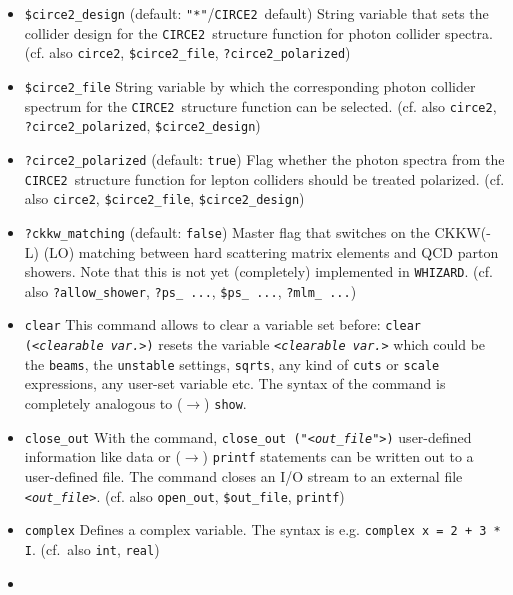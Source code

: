 \documentclass[12pt]{book}
\newcommand{\ttt}[1]{\texttt{#1}}
\newcommand{\whizard}{\texttt{WHIZARD}}
\newcommand{\circetwo}{\texttt{CIRCE2}}
\begin{document}
\begin{itemize}
\item
\ttt{\$circe2\_design} \qquad (default: \ttt{"*"}/\circetwo\ default)
\newline 
String variable that sets the collider design for the \circetwo\
structure function for photon collider spectra. (cf. also
\ttt{circe2}, \ttt{\$circe2\_file}, \ttt{?circe2\_polarized})
\item
\ttt{\$circe2\_file} \newline
String variable by which the corresponding photon collider spectrum
for the \circetwo\ structure function can be selected. (cf. also
\ttt{circe2}, \ttt{?circe2\_polarized}, \ttt{\$circe2\_design})
\item
\ttt{?circe2\_polarized} \qquad (default: \ttt{true}) \newline
Flag whether the photon spectra from the \circetwo\ structure function
for lepton colliders should be treated polarized. (cf. also
\ttt{circe2}, \ttt{\$circe2\_file}, \ttt{\$circe2\_design})
\item
\ttt{?ckkw\_matching} \qquad (default: \ttt{false}) \newline
Master flag that switches on the CKKW(-L) (LO) matching between hard
scattering matrix elements and QCD parton showers. Note that this is
not yet (completely) implemented in \whizard. (cf. also
\ttt{?allow\_shower}, \ttt{?ps\_ ...}, \ttt{\$ps\_ ...}, \ttt{?mlm\_
  ...})  
\item
\ttt{clear} \newline
This command allows to clear a variable set before: \ttt{clear
({\em <clearable var.>})} resets the variable \ttt{{\em <clearable var.>}} which
could be the \ttt{beams}, the \ttt{unstable} settings, \ttt{sqrts},
any kind of \ttt{cuts} or \ttt{scale} expressions, any user-set
variable etc. The syntax of the command is completely analogous to
($\to$) \ttt{show}. 
\item
\ttt{close\_out} \newline
With the command, \ttt{close\_out ("{\em <out\_file">})} user-defined
information like data or ($\to$) \ttt{printf} statements can be
written out to a user-defined file. The command closes an I/O stream to
an external file \ttt{{\em <out\_file>}}. (cf. also \ttt{open\_out},
\ttt{\$out\_file}, \ttt{printf})
\item
\ttt{complex} \newline
Defines a complex variable. The syntax is e.g. \ttt{complex x = 2 + 3
  * I}. (cf.~also \ttt{int}, \ttt{real})
\item

\end{itemize}
\end{document}
